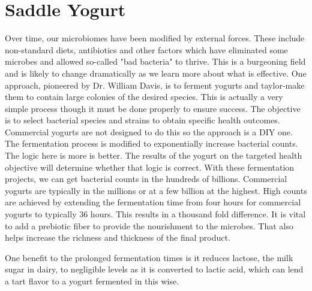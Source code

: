 \section{Saddle Yogurt}
Over time, our microbiomes have been modified by external forces. These include non-standard diets, antibiotics and other factors which have eliminated some microbes and allowed so-called "bad bacteria" to thrive. This is a burgeoning field and is likely to change dramatically as we learn more about what is effective. One approach, pioneered by Dr. William Davis, is to ferment yogurts and taylor-make them to contain large colonies of the desired species. This is actually a very simple process though it must be done properly to ensure success. The objective is to select bacterial species and strains to obtain specific health outcomes. Commercial yogurts are not designed to do this so the approach is a DIY one. The fermentation process is modified to  exponentially increase bacterial counts. The logic here is more is better. The results of the yogurt on the targeted health objective will determine whether that logic is correct. With these fermentation projects, we can get bacterial counts in the hundreds of billions. Commercial yogurts are typically in the millions or at a few billion at the highest. High counts are achieved by extending the fermentation time from four hours for commercial yogurts to typically 36 hours. This results in a thousand fold difference. It is vital to add a prebiotic fiber to provide the nourishment to the microbes. That also helps increase the richness and thickness of the final product.

One benefit to the prolonged fermentation times is it reduces lactose, the milk sugar in dairy, to negligible levels as it is converted to lactic acid, which can lend a tart flavor to a yogurt fermented in this wise.
